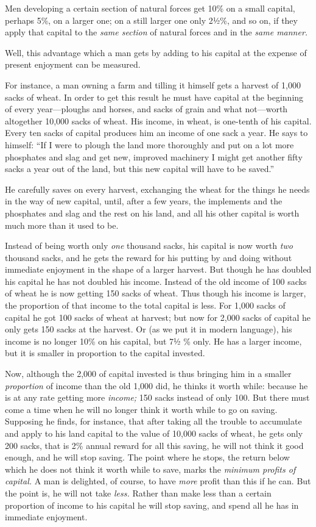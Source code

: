 \documentclass{book}
\begin{document}
Men developing a certain section of natural forces get 10\% on a small capital, perhaps 5\%, on a larger one; on a still larger one only 2½\%, and so on, if they apply that capital to the \emph{same section} of natural forces and in the \emph{same manner.}

Well, this advantage which a man gets by adding to his capital at the expense of present enjoyment can be measured.

For instance, a man owning a farm and tilling it himself gets a harvest of 1,000 sacks of wheat. In order to get this result he must have capital at the beginning of every year—ploughs and horses, and sacks of grain and what not—worth altogether 10,000 sacks of wheat. His income, in wheat, is one-tenth of his capital. Every ten sacks of capital produces him an income of one sack a year. He says to himself: “If I were to plough the land more thoroughly and put on a lot more phosphates and slag and get new, improved machinery I might get another fifty sacks a year out of the land, but this new capital will have to be saved.”

He carefully saves on every harvest, exchanging the wheat for the things he needs in the way of new capital, until, after a few years, the implements and the phosphates and slag and the rest on his land, and all his other capital is worth much more than it used to be.

Instead of being worth only \emph{one} thousand sacks, his capital is now worth \emph{two} thousand sacks, and he gets the reward for his putting by and doing without immediate enjoyment in the shape of a larger harvest. But though he has doubled his capital he has not doubled his income. Instead of the old income of 100 sacks of wheat he is now getting 150 sacks of wheat. Thus though his income is larger, the proportion of that income to the total capital is less. For 1,000 sacks of capital he got 100 sacks of wheat at harvest; but now for 2,000 sacks of capital he only gets 150 sacks at the harvest. Or (as we put it in modern language), his income is no longer 10\% on his capital, but 7½ \% only. He has a larger income, but it is smaller in proportion to the capital invested.

Now, although the 2,000 of capital invested is thus bringing him in a smaller \emph{proportion} of income than the old 1,000 did, he thinks it worth while: because he is at any rate getting more \emph{income;} 150 sacks instead of only 100. But there must come a time when he will no longer think it worth while to go on saving. Supposing he finds, for instance, that after taking all the trouble to accumulate and apply to his land capital to the value of 10,000 sacks of wheat, he gets only 200 sacks, that is 2\% annual reward for all this saving, he will not think it good enough, and he will stop saving. The point where he stops, the return below which he does not think it worth while to save, marks the \emph{minimum profits of capital.} A man is delighted, of course, to have \emph{more} profit than this if he can. But the point is, he will not take \emph{less.} Rather than make less than a certain proportion of income to his capital he will stop saving, and spend all he has in immediate enjoyment.
\end{document}
